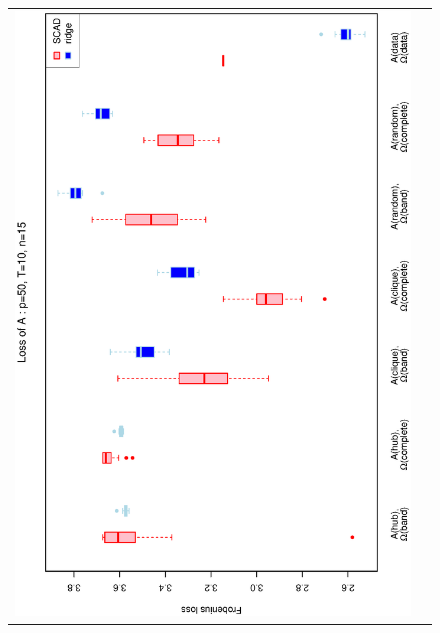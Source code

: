 \documentclass[a4paper]{article}
\begin{document}
\begin{figure}[h!]
\centering
\begin{tabular}{cc}
\includegraphics[scale=0.45,angle=270]{LossA50T10N15_5.eps}
\\

\end{tabular}
\end{figure}
\end{document}
